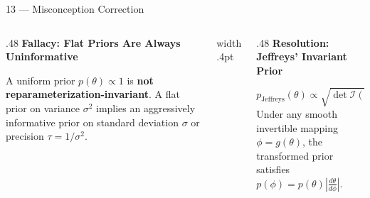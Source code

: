 \documentclass[aspectratio=169,10pt]{beamer}
\begin{document}
\begin{frame}{13 — Misconception Correction}
  \begin{columns}[T,onlytextwidth]
    \begin{column}{.48\textwidth}
      {\small\bfseries\color{BayesCrimson}Fallacy: Flat Priors Are Always Uninformative}\par\BayesGap
      {\small A uniform prior $p(\theta) \propto 1$ is \textbf{not reparameterization-invariant}. A flat prior on variance $\sigma^2$ implies an aggressively informative prior on standard deviation $\sigma$ or precision $\tau = 1/\sigma^2$.}\par\BayesGap
    \end{column}
    \hfill{\color{BayesBorder}\vrule width .4pt}\hfill
    \begin{column}{.48\textwidth}
      {\small\bfseries\color{BayesTeal}Resolution: Jeffreys' Invariant Prior}\par\BayesGap
      \[
        p_{\text{Jeffreys}}(\theta) \propto \sqrt{\det \mathcal{I}(\theta)}
      \]
      \BayesGap
      {\small Under any smooth invertible mapping $\phi = g(\theta)$, the transformed prior satisfies $p(\phi) = p(\theta) |\frac{d\theta}{d\phi}|$.}\par\BayesGap
    \end{column}
  \end{columns}
  \vfill
\end{frame}
\end{document}
